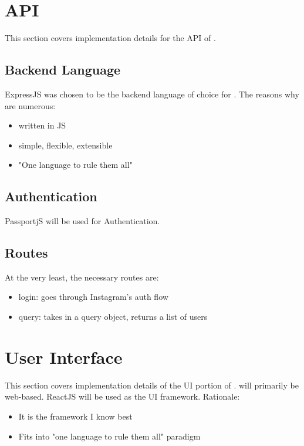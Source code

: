 \section{API}
This section covers implementation details for the API of \serviceName.

\subsection{Backend Language}
ExpressJS was chosen to be the backend language of choice for \serviceName.  The reasons why are numerous:
\begin{itemize}
    \item written in JS
    \item simple, flexible, extensible
    \item "One language to rule them all"
\end{itemize}

\subsection{Authentication}
PassportjS will be used for Authentication.

\subsection{Routes}
At the very least, the necessary routes are:
\begin{itemize}
    \item login: goes through Instagram's auth flow
    \item query: takes in a query object, returns a list of users
\end{itemize}


\section{User Interface}
This section covers implementation details of the UI portion of \serviceName. \serviceName will primarily be web-based. ReactJS will be used as the UI framework. Rationale:
\begin{itemize}
    \item It is the framework I know best
    \item Fits into "one language to rule them all" paradigm
\end{itemize}
